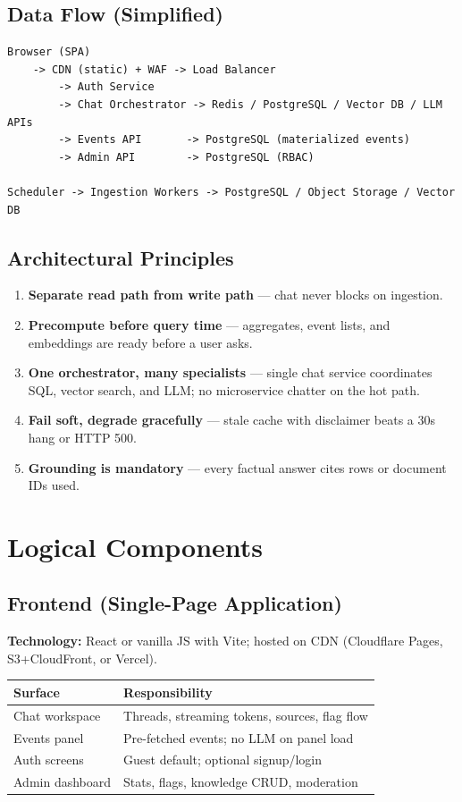 \documentclass[11pt,a4paper]{article}
\begin{document}
\subsection{Data Flow (Simplified)}
\begin{verbatim}
Browser (SPA)
    -> CDN (static) + WAF -> Load Balancer
        -> Auth Service
        -> Chat Orchestrator -> Redis / PostgreSQL / Vector DB / LLM APIs
        -> Events API       -> PostgreSQL (materialized events)
        -> Admin API        -> PostgreSQL (RBAC)

Scheduler -> Ingestion Workers -> PostgreSQL / Object Storage / Vector DB
\end{verbatim}

\subsection{Architectural Principles}
\begin{enumerate}[noitemsep]
  \item \textbf{Separate read path from write path} --- chat never blocks on ingestion.
  \item \textbf{Precompute before query time} --- aggregates, event lists, and embeddings are ready before a user asks.
  \item \textbf{One orchestrator, many specialists} --- single chat service coordinates SQL, vector search, and LLM; no microservice chatter on the hot path.
  \item \textbf{Fail soft, degrade gracefully} --- stale cache with disclaimer beats a 30s hang or HTTP 500.
  \item \textbf{Grounding is mandatory} --- every factual answer cites rows or document IDs used.
\end{enumerate}

\section{Logical Components}

\subsection{Frontend (Single-Page Application)}
\textbf{Technology:} React or vanilla JS with Vite; hosted on CDN (Cloudflare Pages, S3+CloudFront, or Vercel).

\begin{table}[h]
\centering
\small
\begin{tabular}{@{}lp{9cm}@{}}
\toprule
\textbf{Surface} & \textbf{Responsibility} \\
\midrule
Chat workspace & Threads, streaming tokens, sources, flag flow \\
Events panel & Pre-fetched events; no LLM on panel load \\
Auth screens & Guest default; optional signup/login \\
Admin dashboard & Stats, flags, knowledge CRUD, moderation \\
\bottomrule
\end{tabular}
\end{table}
\end{document}
